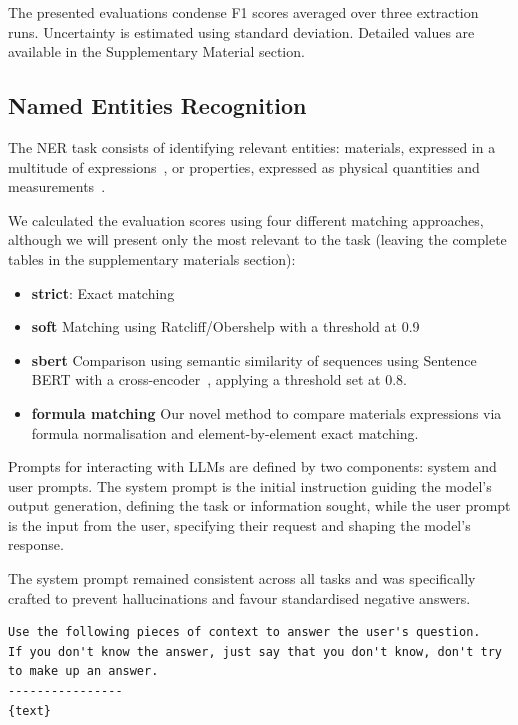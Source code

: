 \documentclass[a4paper]{article}
\begin{document}
The presented evaluations condense F1 scores averaged over three extraction runs. Uncertainty is estimated using standard deviation. 
Detailed values are available in the Supplementary Material section.

\subsection{Named Entities Recognition}
\label{sec:ner}
The NER task consists of identifying relevant entities: materials, expressed in a multitude of expressions~\cite{lfoppiano2021supermat}, or properties, expressed as physical quantities and measurements~\cite{foppiano2019quantities}. 

We calculated the evaluation scores using four different matching approaches, although we will present only the most relevant to the task (leaving the complete tables in the supplementary materials section): 
\begin{itemize}
    \item \textbf{strict}: Exact matching
    \item \textbf{soft} Matching using Ratcliff/Obershelp with a threshold at 0.9
    \item \textbf{sbert} Comparison using semantic similarity of sequences using Sentence BERT with a cross-encoder~\cite{reimers2019sentencebert}, applying a threshold set at 0.8.
    \item \textbf{formula matching} Our novel method to compare materials expressions via formula normalisation and element-by-element exact matching.
\end{itemize}

Prompts for interacting with LLMs are defined by two components: system and user prompts. 
The system prompt is the initial instruction guiding the model's output generation, defining the task or information sought, while the user prompt is the input from the user, specifying their request and shaping the model's response.

The system prompt remained consistent across all tasks and was specifically crafted to prevent hallucinations and favour standardised negative answers.

\begin{lstlisting}[caption=Generic system prompt common to all requests]
Use the following pieces of context to answer the user's question. 
If you don't know the answer, just say that you don't know, don't try to make up an answer. 
----------------
{text}
\end{lstlisting}
\end{document}
